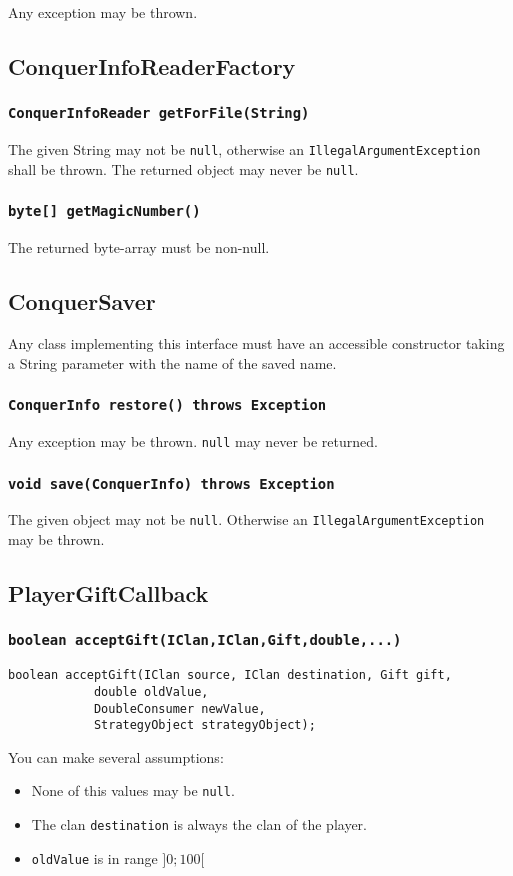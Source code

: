 \documentclass{article}
\begin{document}
Any exception may be thrown. 

\subsection{ConquerInfoReaderFactory}

\subsubsection{\texttt{ConquerInfoReader getForFile(String)}}

The given String may not be \texttt{null}, otherwise an \texttt{IllegalArgumentException} shall be thrown.
The returned object may never be \texttt{null}.

\subsubsection{\texttt{byte[] getMagicNumber()}}
The returned byte-array must be non-null.

\subsection{ConquerSaver}

Any class implementing this interface must have an accessible constructor taking a String parameter
with the name of the saved name.

\subsubsection{\texttt{ConquerInfo restore() throws Exception}}
Any exception may be thrown. \texttt{null} may never be returned.

\subsubsection{\texttt{void save(ConquerInfo) throws Exception}}
The given object may not be \texttt{null}. Otherwise an \texttt{IllegalArgumentException} may be thrown.

\subsection{PlayerGiftCallback}

\subsubsection{\texttt{boolean acceptGift(IClan,IClan,Gift,double,...)}}
\begin{verbatim}
boolean acceptGift(IClan source, IClan destination, Gift gift,
			double oldValue,
			DoubleConsumer newValue,
			StrategyObject strategyObject);
\end{verbatim}
You can make several assumptions:
\begin{itemize}
	\item None of this values may be \texttt{null}.
	\item The clan \texttt{destination} is always the clan of the player.
	\item \texttt{oldValue} is in range $]0;100[$
\end{itemize}
\end{document}
